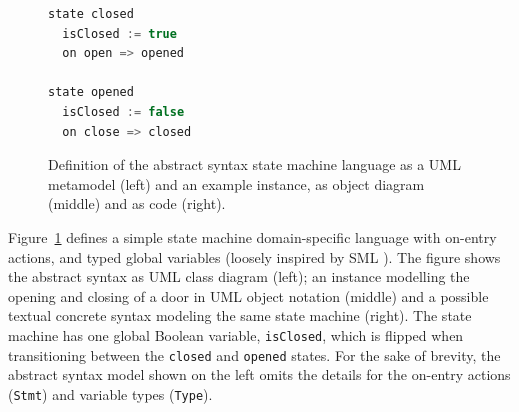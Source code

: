 \documentclass[english,crc]{programming}
\begin{document}
\begin{figure}[t]
\begin{adjustwidth}{-3em}{-3em}
\begin{minipage}{0.3\textwidth}
\begin{lstlisting}[language=java,morekeywords={machine,on,state,var},basicstyle=\footnotesize,numbers=none]
state closed
  isClosed := true
  on open => opened

state opened
  isClosed := false
  on close => closed
\end{lstlisting}
\end{minipage}
\end{adjustwidth}
\caption{Definition of the abstract syntax state machine language as a UML metamodel (left) and
an example instance, as object diagram (middle) and as code (right).}
\label{FIG:statemachineUML}
\end{figure}

Figure~\ref{FIG:statemachineUML} defines a simple state machine domain-specific language with
on-entry actions, and typed global variables (loosely inspired by SML \cite{vanRozen19}).
The figure shows the abstract syntax as UML class diagram (left); an instance modelling the
opening and closing of a door in UML object notation (middle) and a possible textual concrete
syntax modeling the same state machine (right).
%
The state machine has one global Boolean variable, \lstinline{isClosed}, which is flipped when
transitioning between the \lstinline{closed} and \lstinline{opened} states. For the sake of brevity,
the abstract syntax model shown on the left omits the details for the on-entry
actions (\lstinline{Stmt}) and variable types (\lstinline{Type}).


\end{document}
